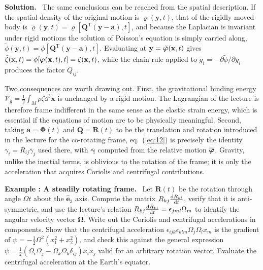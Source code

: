\documentclass[a4paper,12pt]{paper}
\newcounter{example}
\renewenvironment{example}[1]{%
  \refstepcounter{example}%
  \begin{mdframed}[linewidth=1pt,innertopmargin=6pt,innerbottommargin=6pt]%
  \noindent\textbf{Example \theexample: #1.}\ }{%
  \end{mdframed}}
\newenvironment{solution}{\par\noindent\textbf{Solution.}\ }{\par\medskip}
\begin{document}
\begin{solution}
The same conclusions can be reached from the spatial description. If the spatial density of the
original motion is $\varrho(\mathbf{y},t)$, that of the rigidly moved body is
$\tilde{\varrho}(\mathbf{y},t)=\varrho[\mathbf{Q}^{\mathrm{T}}(\mathbf{y}-\mathbf{a}),t]$, and because
the Laplacian is invariant under rigid motions the solution of Poisson's equation is simply carried
along, $\tilde{\phi}(\mathbf{y},t)=\phi[\mathbf{Q}^{\mathrm{T}}(\mathbf{y}-\mathbf{a}),t]$.
Evaluating at $\mathbf{y}=\tilde{\bm{\varphi}}(\mathbf{x},t)$ gives
$\tilde{\zeta}(\mathbf{x},t)=\phi[\bm{\varphi}(\mathbf{x},t),t]=\zeta(\mathbf{x},t)$, while the chain rule
applied to $\tilde{g}_{i}=-\partial\tilde{\phi}/\partial y_{i}$ produces the factor $Q_{ij}$.

Two consequences are worth drawing out. First, the gravitational binding energy
$\mathcal{V}_{g}=\frac{1}{2}\int_{M}\rho\zeta\dd^{3}\mathbf{x}$ is unchanged by a rigid motion.
The Lagrangian of the lecture is therefore frame indifferent in the same sense as the elastic strain
energy, which is essential if the equations of motion are to be physically meaningful. Second,
taking $\mathbf{a}=\bm{\Phi}(t)$ and $\mathbf{Q}=\mathbf{R}(t)$ to be the translation and rotation
introduced in the lecture for the co-rotating frame, eq.~(\ref{eq:12}) is precisely the identity
$\gamma_{i}=R_{ij}\overline{\gamma}_{j}$ used there, with $\overline{\bm{\gamma}}$ computed from the
relative motion $\overline{\bm{\varphi}}$. Gravity, unlike the inertial terms, is oblivious to the rotation
of the frame; it is only the acceleration that acquires Coriolis and centrifugal contributions.
\end{solution}

\begin{example}{A steadily rotating frame}
Let $\mathbf{R}(t)$ be the rotation through angle $\Omega t$ about the $\hat{\mathbf{e}}_{3}$ axis.
Compute the matrix $R_{kj}\frac{\mathrm{d} R_{kl}}{\mathrm{d} t}$, verify that it is anti-symmetric, and use the
lecture's relation $R_{kj}\frac{\mathrm{d} R_{kl}}{\mathrm{d} t}=\epsilon_{jml}\Omega_{m}$ to identify the angular
velocity vector $\bm{\Omega}$. Write out the Coriolis and centrifugal accelerations in components.
Show that the centrifugal acceleration $\epsilon_{ijk}\epsilon_{klm}\Omega_{j}\Omega_{l}x_{m}$ is
the gradient of $\psi=-\frac{1}{2}\Omega^{2}(x_{1}^{2}+x_{2}^{2})$, and check this against the
general expression $\psi=\frac{1}{2}(\Omega_{i}\Omega_{j}-\Omega_{k}\Omega_{k}\delta_{ij})x_{i}x_{j}$
valid for an arbitrary rotation vector. Evaluate the centrifugal acceleration at the Earth's equator.
\end{example}
\end{document}
